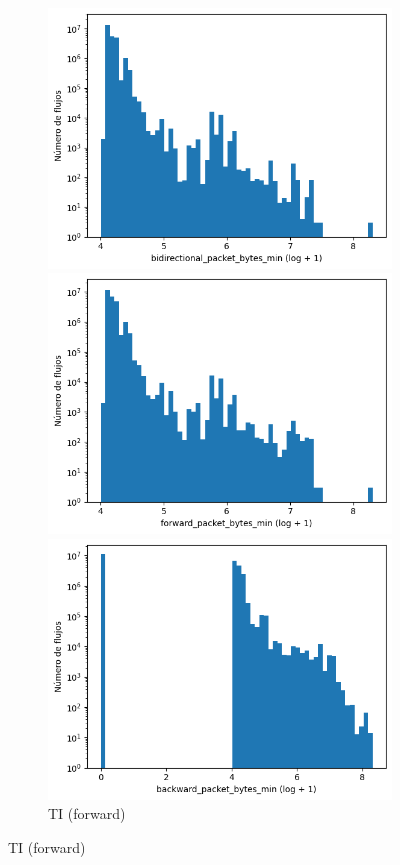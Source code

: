 \begin{figure}[H]
\begin{subfigure}[b]{0.26\textwidth}
        \includegraphics[width=\linewidth]{media/packet_pincer_toniot/bidirectional_packet_bytes_min_log_x_log_y.png}
        \caption{TI (bidir.)}
        \includegraphics[width=\textwidth]{media/packet_pincer_toniot/forward_packet_bytes_min_log_x_log_y.png}
        \caption{TI (forward)}
        \includegraphics[width=\textwidth]{media/packet_pincer_toniot/backward_packet_bytes_min_log_x_log_y.png}

\end{subfigure}
\end{figure}
